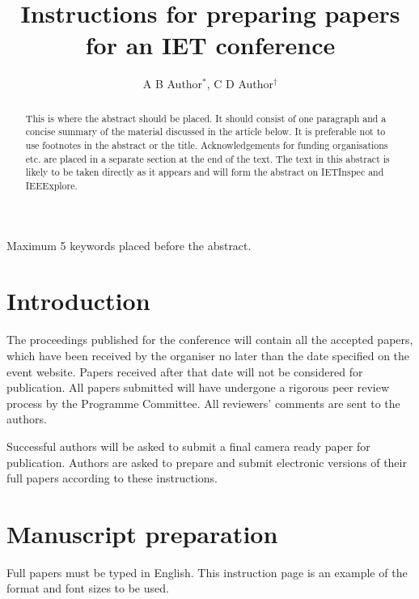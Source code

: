 \documentclass{IETpaper}
\begin{document}

\title{Instructions for preparing papers for an IET conference}

\author{A B Author$^{\ast}$, C D Author$^{\dag}$}


\maketitle

\begin{keywords}
Maximum 5 keywords placed before the abstract.
\end{keywords}

\begin{abstract}
This is where the abstract should be placed. It should consist of one 
paragraph and a concise summary of the material discussed in the article 
below. It is preferable not to use footnotes in the abstract or the title. 
Acknowledgements for funding organisations etc. are placed in a separate 
section at the end of the text. The text in this abstract is likely to be 
taken directly as it appears and will form the abstract on IETInspec and 
IEEExplore.
\end{abstract}

\section{Introduction}%

The proceedings published for the conference will contain all the accepted 
papers, which have been received by the organiser no later than the 
date specified on the event website. Papers received after that date will 
not be considered for publication. All papers submitted will have undergone 
a rigorous peer review process by the Programme Committee. All reviewers' 
comments are sent to the authors. 


Successful authors will be asked to submit a final camera ready paper for 
publication. Authors are asked to prepare and submit electronic 
versions of their full papers according to these instructions.

\section{Manuscript preparation}%

Full papers must be typed in English. This instruction page is an example of 
the format and font sizes to be used.
\end{document}
